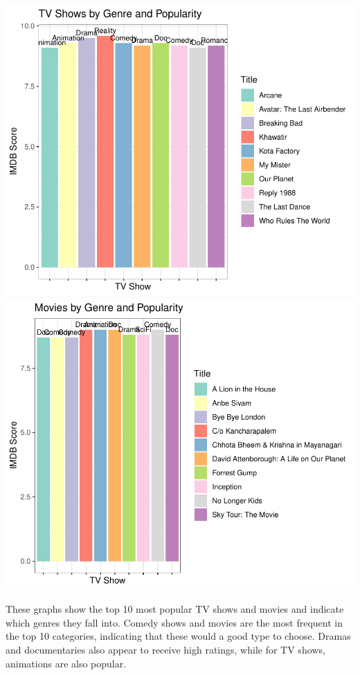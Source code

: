 \documentclass[11pt,preprint, authoryear]{elsarticle}
\numberwithin{equation}{section}
\numberwithin{figure}{section}
\numberwithin{table}{section}
\begin{document}
\includegraphics{Question-4_files/figure-latex/unnamed-chunk-2-1.pdf}
\newpage
\includegraphics{Question-4_files/figure-latex/unnamed-chunk-3-1.pdf}

These graphs show the top 10 most popular TV shows and movies and
indicate which genres they fall into. Comedy shows and movies are the
most frequent in the top 10 categories, indicating that these would a
good type to choose. Dramas and documentaries also appear to receive
high ratings, while for TV shows, animations are also popular.
\end{document}
